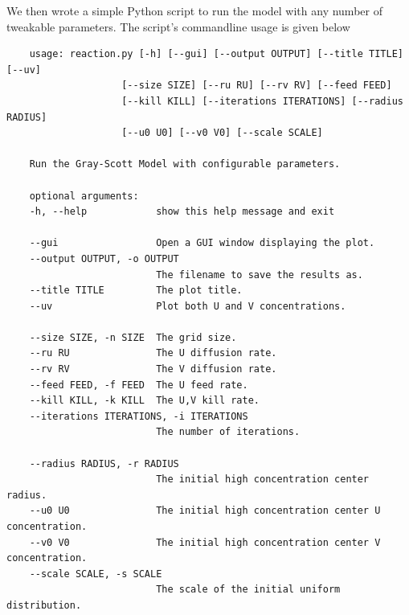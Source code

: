 We then wrote a simple Python script to run the model with any number of tweakable parameters.
The script's commandline usage is given below
\begin{verbatim}
    usage: reaction.py [-h] [--gui] [--output OUTPUT] [--title TITLE] [--uv]
                    [--size SIZE] [--ru RU] [--rv RV] [--feed FEED]
                    [--kill KILL] [--iterations ITERATIONS] [--radius RADIUS]
                    [--u0 U0] [--v0 V0] [--scale SCALE]

    Run the Gray-Scott Model with configurable parameters.

    optional arguments:
    -h, --help            show this help message and exit

    --gui                 Open a GUI window displaying the plot.
    --output OUTPUT, -o OUTPUT
                          The filename to save the results as.
    --title TITLE         The plot title.
    --uv                  Plot both U and V concentrations.

    --size SIZE, -n SIZE  The grid size.
    --ru RU               The U diffusion rate.
    --rv RV               The V diffusion rate.
    --feed FEED, -f FEED  The U feed rate.
    --kill KILL, -k KILL  The U,V kill rate.
    --iterations ITERATIONS, -i ITERATIONS
                          The number of iterations.

    --radius RADIUS, -r RADIUS
                          The initial high concentration center radius.
    --u0 U0               The initial high concentration center U concentration.
    --v0 V0               The initial high concentration center V concentration.
    --scale SCALE, -s SCALE
                          The scale of the initial uniform distribution.
\end{verbatim}

